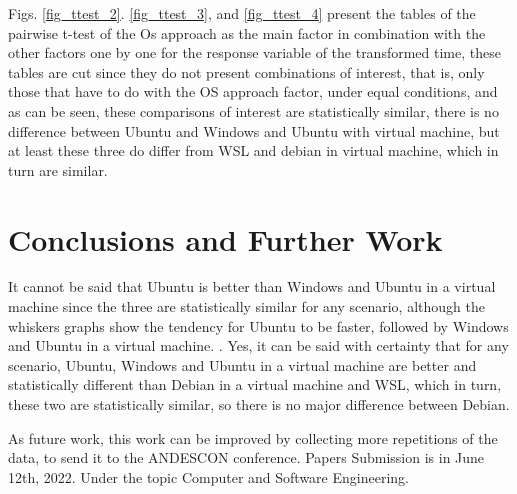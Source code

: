 \documentclass[conference]{IEEEtran}
\begin{document}
Figs. \ref{fig_ttest_2}. \ref{fig_ttest_3}, and \ref{fig_ttest_4} present the tables of the pairwise t-test of the Os approach as the main factor in combination with the other factors one by one for the response variable of the transformed time, these tables are cut since they do not present combinations of interest, that is, only those that have to do with the OS approach factor, under equal conditions, and as can be seen, these comparisons of interest are statistically similar, there is no difference between Ubuntu and Windows and Ubuntu with virtual machine, but at least these three do differ from WSL and debian in virtual machine, which in turn are similar.\par



\section{Conclusions and Further Work}
It cannot be said that Ubuntu is better than Windows and Ubuntu in a virtual machine since the three are statistically similar for any scenario, although the whiskers graphs show the tendency for Ubuntu to be faster, followed by Windows and Ubuntu in a virtual machine. .
Yes, it can be said with certainty that for any scenario, Ubuntu, Windows and Ubuntu in a virtual machine are better and statistically different than Debian in a virtual machine and WSL, which in turn, these two are statistically similar, so there is no major difference between Debian.\par
As future work, this work can be improved by collecting more repetitions of the data, to send it to the ANDESCON conference. Papers Submission is in June 12th, 2022. Under the topic Computer and Software Engineering.



\end{document}
